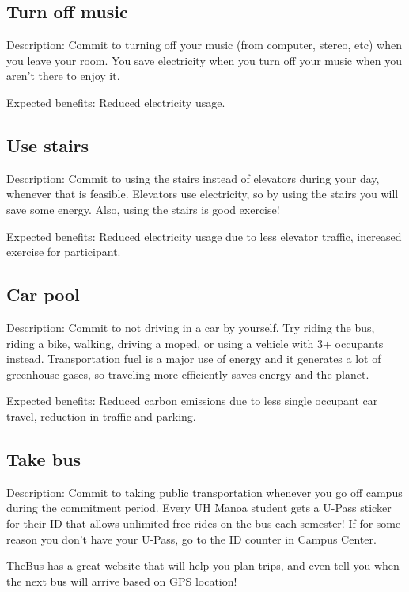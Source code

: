 \subsection{Turn off music}

Description: Commit to turning off your music (from computer, stereo, etc) when you leave your room. You save electricity when you turn off your music when you aren't there to enjoy it.

Expected benefits: Reduced electricity usage.


\subsection{Use stairs}

Description: Commit to using the stairs instead of elevators during your day, whenever that is feasible. Elevators use electricity, so by using the stairs you will save some energy. Also, using the stairs is good exercise!

Expected benefits: Reduced electricity usage due to less elevator traffic, increased exercise for participant.


\subsection{Car pool}

Description: Commit to not driving in a car by yourself. Try riding the bus, riding a bike, walking, driving a moped, or using a vehicle with 3+ occupants instead. Transportation fuel is a major use of energy and it generates a lot of greenhouse gases, so traveling more efficiently saves energy and the planet.

Expected benefits: Reduced carbon emissions due to less single occupant car travel, reduction in traffic and parking.


\subsection{Take bus}

Description: Commit to taking public transportation whenever you go off campus during the commitment period. Every UH Manoa student gets a U-Pass sticker for their ID that allows unlimited free rides on the bus each semester! If for some reason you don't have your U-Pass, go to the ID counter in Campus Center.

TheBus has a great website that will help you plan trips, and even tell you when the next bus will arrive based on GPS location!


